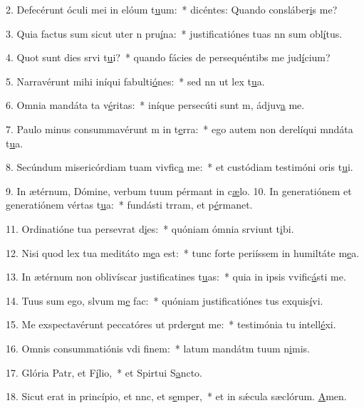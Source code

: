 2. Defecérunt óculi mei in elóum t\uline{u}um:~* dicéntes: Quando consláber\uline{i}s me?\par 
3. Quia factus sum sicut uter n pru\uline{í}na:~* justificatiónes tuas nn sum obl\uline{í}tus.\par 
4. Quot sunt dies srvi t\uline{u}i?~* quando fácies de persequéntibs me jud\uline{í}cium?\par 
5. Narravérunt mihi iníqui fabulti\uline{ó}nes:~* sed nn ut lex t\uline{u}a.\par 
6. Omnia mandáta ta v\uline{é}ritas:~* iníque persecúti sunt m, ádjuv\uline{a} me.\par 
7. Paulo minus consummavérunt m in t\uline{e}rra:~* ego autem non derelíqui mndáta t\uline{u}a.\par 
8. Secúndum misericórdiam tuam vivfic\uline{a} me:~* et custódiam testimóni oris t\uline{u}i.\par 
9. In ætérnum, Dómine, verbum tuum pérmant in c\uline{æ}lo.
10. In generatiónem et generatiónem vértas t\uline{u}a:~* fundásti trram, et p\uline{é}rmanet.\par 
11. Ordinatióne tua persevrat d\uline{i}es:~* quóniam ómnia srviunt t\uline{i}bi.\par 
12. Nisi quod lex tua meditáto m\uline{e}a est:~* tunc forte periíssem in humiltáte m\uline{e}a.\par 
13. In ætérnum non oblivíscar justificatines t\uline{u}as:~* quia in ipsis vvific\uline{á}sti me.\par 
14. Tuus sum ego, slvum m\uline{e} fac:~* quóniam justificatiónes tus exquis\uline{í}vi.\par 
15. Me exspectavérunt peccatóres ut prder\uline{e}nt me:~* testimónia tu intell\uline{é}xi.\par 
16. Omnis consummatiónis vdi f\uline{i}nem:~* latum mandátm tuum n\uline{i}mis.\par 
17. Glória Patr, et F\uline{í}lio,~* et Spirtui S\uline{a}ncto.\par 
18. Sicut erat in princípio, et nnc, et s\uline{e}mper,~* et in sǽcula sæclórum. \uline{A}men.\par 

